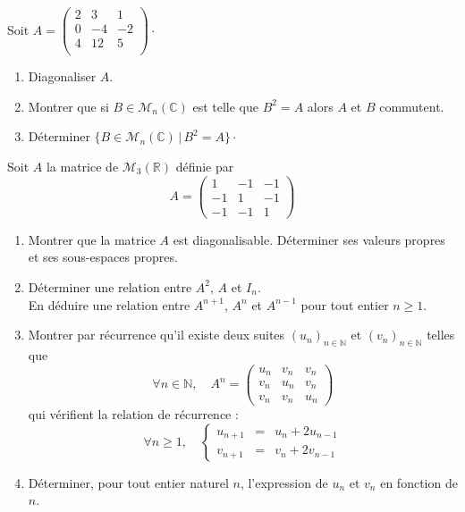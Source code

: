 \documentclass[a4paper,10pt]{report}
\begin{document}
\begin{Exercice}{} Soit $A= \begin{pmatrix}
2 & 3 & 1 \\
0 & -4 & -2 \\
4 & 12 & 5 \\
\end{pmatrix}\cdot$

\begin{enumerate}
\item Diagonaliser $A$.
\item Montrer que si $B \in \mathcal{M}_n(\mathbb{C})$ est telle que $B^2=A$ alors $A$ et $B$ commutent.
\item Déterminer $\lbrace B \in \mathcal{M}_n(\mathbb{C}) \, \vert \, B^2=A \rbrace \cdot$
\end{enumerate}
\end{Exercice} 


\begin{Exercice}{}
Soit $A$ la matrice de $\mathcal{M}_{3}\left(\mathbb{R}\right)$
d\'efinie par
\[
A=\left(\begin{array}{ccc}
1 & -1 & -1\\
-1 & 1 & -1\\
-1 & -1 & 1
\end{array}\right)
\]

\begin{enumerate}
\item Montrer que la matrice $A$ est diagonalisable. D\'eterminer ses valeurs propres et ses sous-espaces propres.
\item D\'eterminer une relation entre $A^{2}$, $A$ et $I_{n}$.\\
En d\'eduire une relation entre $A^{n+1}$, $A^{n}$ et $A^{n-1}$ pour
tout entier $n\geq1$.
\item Montrer par r\'ecurrence qu'il existe deux suites $\left(u_{n}\right)_{n\in\mathbb{N}}$
et $\left(v_{n}\right)_{n\in\mathbb{N}}$ telles que
\[
\forall n\in\mathbb{N},\quad A^{n}=\left(\begin{array}{ccc}
u_{n} & v_{n} & v_{n}\\
v_{n} & u_{n} & v_{n}\\
v_{n} & v_{n} & u_{n}
\end{array}\right)
\]
qui v\'erifient la relation de r\'ecurrence :
\[
\forall n\geq1,\quad\left\{ \begin{array}{ccc}
u_{n+1} & = & u_{n}+2u_{n-1}\\
v_{n+1} & = & v_{n}+2v_{n-1}
\end{array}\right.
\]
\item D\'eterminer, pour tout entier naturel $n$, l'expression de $u_{n}$
et $v_{n}$ en fonction de $n$.
\end{enumerate}
\end{Exercice}
\end{document}
